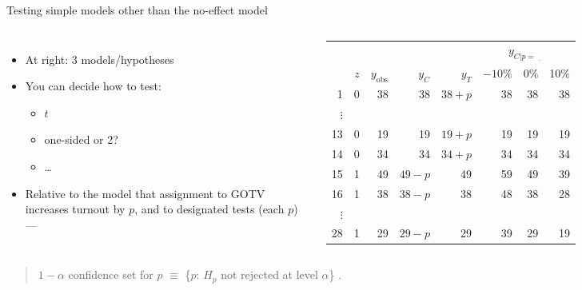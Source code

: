\begin{frame}{Testing simple models other than the no-effect model}

\begin{columns}

\begin{itemize}
\item At right: 3 models/hypotheses
\item You can decide how to test:
  \begin{itemize}
  \item $t$
  \item one-sided or 2? 
  \item \ldots
  \end{itemize}
\item Relative to the model that assignment to GOTV increases turnout by
  $p$, and to designated tests (each $p$) ---  
\end{itemize}
{\small
\addtolength{\tabcolsep}{-\tabcolsepadj} 
  \begin{tabular}{r|rr|rr|rrr}
  \hline
  &       &                           &           &         &
                                                              \multicolumn{3}{c}{$y_{C
                                                              | p=
                                                              \underline{\hspace{1em}}}$} \\
 & $z$ & $y_{\mathrm{obs}}$ & $y_C$ & $y_T$ & $-10$\% & 0\% & 10\% \\
  \hline
1 & 0 & 38 & 38 & $38+p$ & 38 & 38 & 38\\
$\vdots$& & & & & &  &\\
13 & 0 & 19 & 19& $19+p$ & 19 & 19 & 19\\
14 & 0 & 34 & 34& $34+p$& 34 & 34 & 34 \\
15 & 1 & 49 & $49-p$& 49 & 59 & 49 & 39 \\
16 & 1 & 38 & $38-p$& 38 & 48 & 38 & 28 \\
$\vdots$& & & & & & &\\
28 & 1 & 29 & $29-p$& 29 & 39 & 29 & 19 \\
   \hline
\end{tabular}
 \addtolength{\tabcolsep}{\tabcolsepadj}
}

\end{columns}
  \vfill 
\begin{quote}
$1-\alpha$ confidence set for $p$ $\equiv $ \{$p$: $H_{p}$ not rejected at
  level $\alpha$\} .  
\end{quote}

\vfill
\end{frame}

